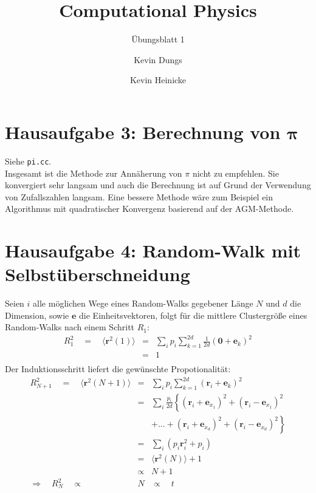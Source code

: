 \documentclass{scrartcl}
\author{Kevin Dungs \and Kevin Heinicke}
\title{Computational Physics}
\subtitle{Übungsblatt 1}
\renewcommand{\vec}[1]{\mathbf{#1}}
\begin{document}
\maketitle

\section*{Hausaufgabe 3: Berechnung von $\mathbf{\pi}$}
Siehe \texttt{pi.cc}. \\

Insgesamt ist die Methode zur Annäherung von $\pi$ nicht zu empfehlen. Sie konvergiert sehr langsam und auch die Berechnung ist auf Grund der Verwendung von Zufallszahlen langsam. Eine bessere Methode wäre zum Beispiel ein Algorithmus mit quadratischer Konvergenz basierend auf der AGM-Methode.

\section*{Hausaufgabe 4: Random-Walk mit Selbstüberschneidung}
Seien $i$ alle möglichen Wege eines Random-Walks gegebener Länge $N$ und $d$ die Dimension, sowie $\vec{e}$ die Einheitsvektoren, folgt für die mittlere Clustergröße eines Random-Walks nach einem Schritt $R_1$:
    \begin{eqnarray*}
        R_1^2 \quad = \quad \langle \vec{r}^2(1) \rangle & = & \sum_i p_i \sum_{k=1}^{2d} \frac{1}{2d}\left(\vec{0} + \vec{e}_k \right)^2 \\
        & = & 1 \\
    \end{eqnarray*}
Der Induktionsschritt liefert die gewünschte Propotionalität:
    \begin{eqnarray*}
        R_{N+1}^2 \quad = \quad \langle \vec{r}^2(N+1) \rangle & = & \sum_i p_i \sum_{k=1}^{2d} \left( \vec{r}_i + \vec{e}_k \right)^2 \\
                                                               & = & \sum_i \frac{p_i}{2d} \left\{ \left( \vec{r}_i + \vec{e}_{x_1} \right)^2 + \left( \vec{r}_i - \vec{e}_{x_1} \right)^2 \right. \\ 
                                                               & & \left. + \dots + \left( \vec{r}_i + \vec{e}_{x_d} \right)^2 + \left( \vec{r}_i - \vec{e}_{x_d} \right)^2 \right\} \\
                                                               & = & \sum_i \left( p_i \vec{r}_i^2 + p_i \right) \\
                                                               & = & \langle \vec{r}^2(N) \rangle + 1 \\
                                                               & \propto & N + 1 \\
        \Rightarrow \quad R_N^2 \quad \propto & N & \propto \quad t
    \end{eqnarray*}
\end{document}
